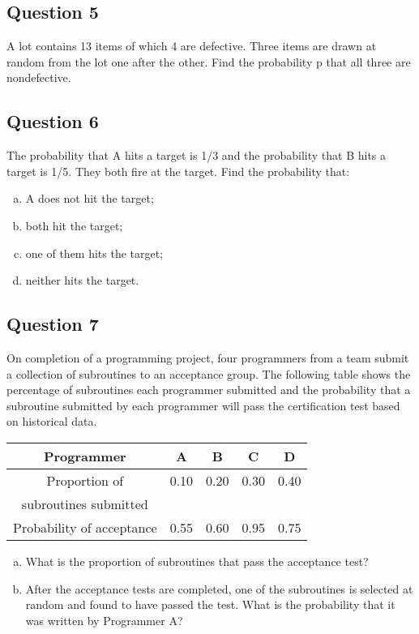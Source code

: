 \documentclass[a4paper,12pt]{article}
\begin{document}
\subsection*{Question 5}
A lot contains 13 items of which 4 are defective. Three items are drawn at random from the lot one after the other. Find the probability p that all three are nondefective.
\subsection*{Question 6}
The probability that A hits a target is 1/3 and the probability that B hits a target is 1/5.  They both fire at the target. Find the probability that:
\begin{enumerate}[(a)]
    \item A does not hit the target; 
    \item both hit the target; 
    \item one of them hits the target; 
    \item neither hits the target.
\end{enumerate}


\subsection*{Question 7}
On completion of a programming project, four programmers from a team submit a collection of subroutines to an acceptance group. The following table shows the percentage of subroutines each programmer submitted and the probability that a subroutine submitted by each programmer will pass the certification test based on historical data.

\begin{center}
    \begin{tabular}{|c|c|c|c|c|}
 \hline
Programmer	& A	& B	& C	& D\\ \hline
Proportion of & 0.10	& 0.20	& 0.30&	0.40\\
subroutines submitted	& & & & \\ \hline
Probability of acceptance	& 0.55	& 0.60	& 0.95	& 0.75 \\ \hline
\end{tabular}

\end{center}

 \begin{enumerate}[(a)]
    \item 
 What is the proportion of subroutines that pass the acceptance test?
\item  After the acceptance tests are completed, one of the subroutines is selected at random and found to have passed the test. What is the probability that it was written by Programmer A?
\end{enumerate} 
\end{document}
